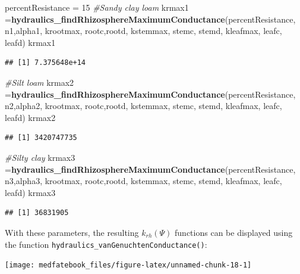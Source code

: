 \documentclass[]{book}
\newenvironment{Shaded}{\begin{snugshade}}{\end{snugshade}}
\newcommand{\KeywordTok}[1]{\textcolor[rgb]{0.13,0.29,0.53}{\textbf{#1}}}
\newcommand{\DecValTok}[1]{\textcolor[rgb]{0.00,0.00,0.81}{#1}}
\newcommand{\StringTok}[1]{\textcolor[rgb]{0.31,0.60,0.02}{#1}}
\newcommand{\CommentTok}[1]{\textcolor[rgb]{0.56,0.35,0.01}{\textit{#1}}}
\newcommand{\NormalTok}[1]{#1}
\begin{document}
\begin{Shaded}
\begin{Highlighting}[]
\NormalTok{percentResistance =}\StringTok{ }\DecValTok{15}
\CommentTok{#Sandy clay loam }
\NormalTok{krmax1 =}\KeywordTok{hydraulics_findRhizosphereMaximumConductance}\NormalTok{(percentResistance, }
\NormalTok{                      n1,alpha1, krootmax, rootc,rootd, kstemmax, stemc, stemd,}
\NormalTok{                      kleafmax, leafc, leafd)}
\NormalTok{krmax1}
\end{Highlighting}
\end{Shaded}

\begin{verbatim}
## [1] 7.375648e+14
\end{verbatim}

\begin{Shaded}
\begin{Highlighting}[]
\CommentTok{#Silt loam}
\NormalTok{krmax2 =}\KeywordTok{hydraulics_findRhizosphereMaximumConductance}\NormalTok{(percentResistance, }
\NormalTok{                      n2,alpha2, krootmax, rootc,rootd, kstemmax, stemc, stemd,}
\NormalTok{                      kleafmax, leafc, leafd)}
\NormalTok{krmax2}
\end{Highlighting}
\end{Shaded}

\begin{verbatim}
## [1] 3420747735
\end{verbatim}

\begin{Shaded}
\begin{Highlighting}[]
\CommentTok{#Silty clay}
\NormalTok{krmax3 =}\KeywordTok{hydraulics_findRhizosphereMaximumConductance}\NormalTok{(percentResistance, }
\NormalTok{                      n3,alpha3, krootmax, rootc,rootd, kstemmax, stemc, stemd,}
\NormalTok{                      kleafmax, leafc, leafd)}
\NormalTok{krmax3}
\end{Highlighting}
\end{Shaded}

\begin{verbatim}
## [1] 36831905
\end{verbatim}

With these parameters, the resulting \(k_{rh}(\Psi)\) functions can be
displayed using the function
\texttt{hydraulics\_vanGenuchtenConductance()}:

\begin{center}\texttt{[image: medfatebook\_files/figure-latex/unnamed-chunk-18-1]} \end{center}
\end{document}
